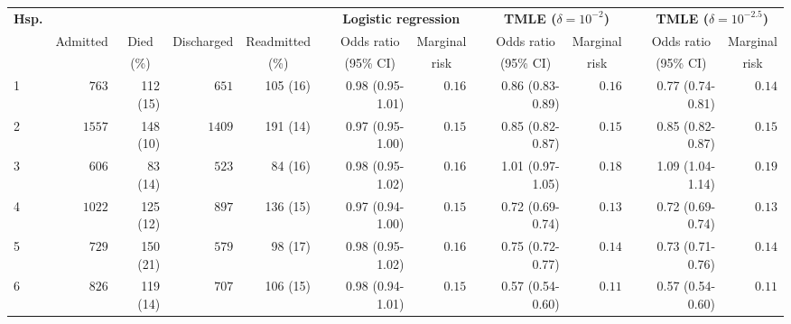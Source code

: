 \documentclass[]{article}\usepackage[]{graphicx}\usepackage[]{color}
\begin{document}
\begin{landscape}
\setmainfont[Scale=1]{Cambria}
\linespread{1}
\begin{table}[!tbp]
\begin{center}
\begin{tabular}{lrrrrcrrcrrcrr}
\hline\hline
\multicolumn{1}{l}{\bfseries Hsp.}&\multicolumn{4}{c}{\bfseries }&\multicolumn{1}{c}{\bfseries }&\multicolumn{2}{c}{\bfseries Logistic regression}&\multicolumn{1}{c}{\bfseries }&\multicolumn{2}{c}{\bfseries TMLE ($\delta=10^{-2}$)}&\multicolumn{1}{c}{\bfseries }&\multicolumn{2}{c}{\bfseries TMLE ($\delta=10^{-2.5}$)}\tabularnewline
\cline{7-8} \cline{10-11} \cline{13-14}
\multicolumn{1}{l}{}&\multicolumn{1}{c}{Admitted}&\multicolumn{1}{c}{Died}&\multicolumn{1}{c}{Discharged}&\multicolumn{1}{c}{Readmitted}&\multicolumn{1}{c}{}&\multicolumn{1}{c}{Odds ratio}&\multicolumn{1}{c}{Marginal}&\multicolumn{1}{c}{}&\multicolumn{1}{c}{Odds ratio}&\multicolumn{1}{c}{Marginal}&\multicolumn{1}{c}{}&\multicolumn{1}{c}{Odds ratio}&\multicolumn{1}{c}{Marginal}\tabularnewline
&&\multicolumn{1}{c}{{\scriptsize (\%)}}&&\multicolumn{1}{c}{{\scriptsize (\%)}}&&\multicolumn{1}{c}{{\scriptsize (95\% CI)}}&\multicolumn{1}{c}{{\scriptsize risk}}&&\multicolumn{1}{c}{{\scriptsize (95\% CI)}}&\multicolumn{1}{c}{{\scriptsize risk}}&&\multicolumn{1}{c}{{\scriptsize (95\% CI)}}&\multicolumn{1}{c}{{\scriptsize risk}}\tabularnewline
\hline
1&$ 763$&112 (15)&$ 651$&105 (16)&&0.98 (0.95-1.01)&$0.16$&&0.86 (0.83-0.89)&$0.16$&&0.77 (0.74-0.81)&$0.14$\tabularnewline
2&$1557$&148 (10)&$1409$&191 (14)&&0.97 (0.95-1.00)&$0.15$&&0.85 (0.82-0.87)&$0.15$&&0.85 (0.82-0.87)&$0.15$\tabularnewline
3&$ 606$&83 (14)&$ 523$&84 (16)&&0.98 (0.95-1.02)&$0.16$&&1.01 (0.97-1.05)&$0.18$&&1.09 (1.04-1.14)&$0.19$\tabularnewline
4&$1022$&125 (12)&$ 897$&136 (15)&&0.97 (0.94-1.00)&$0.15$&&0.72 (0.69-0.74)&$0.13$&&0.72 (0.69-0.74)&$0.13$\tabularnewline
5&$ 729$&150 (21)&$ 579$&98 (17)&&0.98 (0.95-1.02)&$0.16$&&0.75 (0.72-0.77)&$0.14$&&0.73 (0.71-0.76)&$0.14$\tabularnewline
6&$ 826$&119 (14)&$ 707$&106 (15)&&0.98 (0.94-1.01)&$0.15$&&0.57 (0.54-0.60)&$0.11$&&0.57 (0.54-0.60)&$0.11$\tabularnewline

\end{tabular}
\end{center}
\end{table}
\end{landscape}
\end{document}
